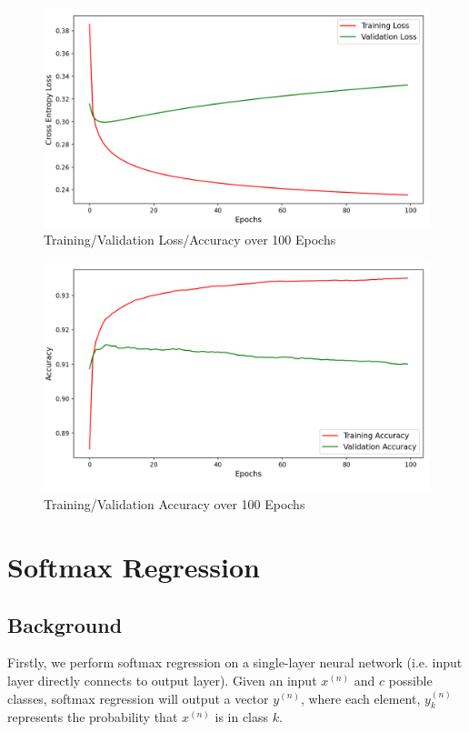 \begin{figure}[h]
	\centering
	\label{fig:loss}
	\includegraphics[width=1.0\textwidth]{./images/loss.png}
	\caption{Training/Validation Loss/Accuracy over 100 Epochs}
\end{figure}

\begin{figure}[h]
	\centering
	\label{fig:acc}
	\includegraphics[width=1.0\textwidth]{./images/acc.png}
	\caption{Training/Validation Accuracy over 100 Epochs}
\end{figure}
\section{Softmax Regression}

\subsection{Background}
Firstly, we perform softmax regression on a single-layer neural network (i.e.
input layer directly connects to output layer). Given an input $x^{(n)}$ and $c$
possible classes, softmax regression will output a vector $y^{(n)}$, where each
element, $y^{(n)}_k$ represents the probability that $x^{(n)}$ is in class $k$.


